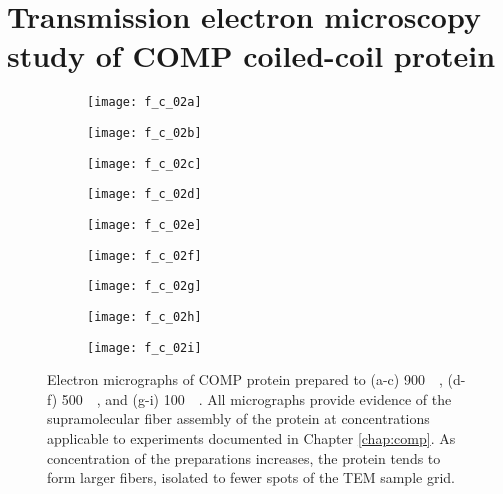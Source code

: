 \section{Transmission electron microscopy study of COMP coiled-coil protein}
\begin{figure}
    \centering
    \begin{subfigure}[b]{0.31\textwidth}
        \texttt{[image: f\_c\_02a]}
        \caption{}
    \end{subfigure}
    \begin{subfigure}[b]{0.31\textwidth}
        \texttt{[image: f\_c\_02b]}
        \caption{}
    \end{subfigure}
    \begin{subfigure}[b]{0.31\textwidth}
        \texttt{[image: f\_c\_02c]}
        \caption{}
    \end{subfigure}
    \begin{subfigure}[b]{0.31\textwidth}
        \texttt{[image: f\_c\_02d]}
        \caption{}
    \end{subfigure}
    \begin{subfigure}[b]{0.31\textwidth}
        \texttt{[image: f\_c\_02e]}
        \caption{}
    \end{subfigure}
    \begin{subfigure}[b]{0.31\textwidth}
        \texttt{[image: f\_c\_02f]}
        \caption{}
    \end{subfigure}
    \begin{subfigure}[b]{0.31\textwidth}
        \texttt{[image: f\_c\_02g]}
        \caption{}
    \end{subfigure}
    \begin{subfigure}[b]{0.31\textwidth}
        \texttt{[image: f\_c\_02h]}
        \caption{}
    \end{subfigure}
    \begin{subfigure}[b]{0.31\textwidth}
        \texttt{[image: f\_c\_02i]}
        \caption{}
    \end{subfigure}
    \caption{Electron micrographs of COMP protein prepared to (a-c)
        \SI{900}{\micro\moLar}, (d-f) \SI{500}{\micro\moLar}, and
        (g-i) \SI{100}{\micro\moLar}. All micrographs provide evidence of the
    supramolecular fiber assembly of the protein at concentrations applicable to
     experiments documented in Chapter \ref{chap:comp}. As
concentration of the preparations increases, the protein tends to form larger
fibers, isolated to fewer spots of the TEM sample grid.}\label{fig:COMP_EM_3}
\end{figure}
